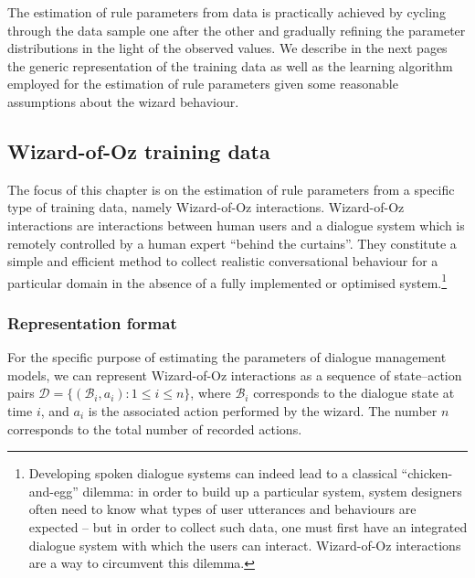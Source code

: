 The estimation of rule parameters from data is practically achieved by cycling through the data sample one after the other and gradually refining the parameter distributions in the light of the observed values. We describe in the next pages the generic representation of the training data as well as the learning algorithm employed for the estimation of rule parameters given some reasonable assumptions about the wizard behaviour.  

\subsection{Wizard-of-Oz training data}
\label{sec:rule-supervised-oz}

The focus of this chapter is on the estimation of rule parameters from a specific type of training data, namely Wizard-of-Oz interactions. Wizard-of-Oz interactions are interactions between human users and a dialogue system which is remotely controlled by a human expert ``behind the curtains''.  They constitute a simple and efficient method to collect realistic conversational behaviour for a particular domain in the absence of a fully implemented or optimised system.\footnote{Developing spoken dialogue systems can indeed lead to a classical ``chicken-and-egg'' dilemma: in order to build up a particular system, system designers often need to know what types of user utterances and behaviours are expected -- but in order to collect such data, one must first have an integrated dialogue system with which the users can interact.  Wizard-of-Oz interactions are a way to circumvent this dilemma.}


\subsubsection*{Representation format}

For the specific purpose of estimating the parameters of dialogue management models, we can represent Wizard-of-Oz interactions as a sequence of state--action pairs $\mathcal{D} = \{( \mathcal{B}_i, a_i ) : 1 \leq i \leq n\}$, where $\mathcal{B}_i$ corresponds to the dialogue state at time $i$, and $a_i$ is the associated action performed by the wizard.  The number $n$ corresponds to the total number of recorded actions. 


